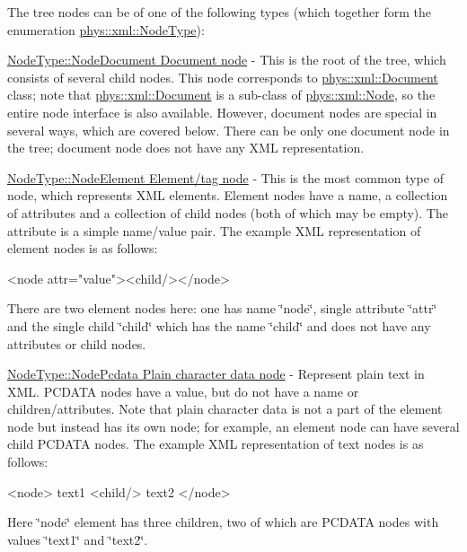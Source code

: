  \par
 The tree nodes can be of one of the following types (which together form the enumeration \hyperlink{namespacephys_1_1xml_a668b0cc666a9d49f7c7222a7552115d3}{phys::xml::NodeType}):
\begin{DoxyItemize}
\item \hyperlink{namespacephys_1_1xml_a668b0cc666a9d49f7c7222a7552115d3}{NodeType::NodeDocument Document node} -\/ This is the root of the tree, which consists of several child nodes. This node corresponds to \hyperlink{classphys_1_1xml_1_1Document}{phys::xml::Document} class; note that \hyperlink{classphys_1_1xml_1_1Document}{phys::xml::Document} is a sub-\/class of \hyperlink{classphys_1_1xml_1_1Node}{phys::xml::Node}, so the entire node interface is also available. However, document nodes are special in several ways, which are covered below. There can be only one document node in the tree; document node does not have any XML representation. \par

\item \hyperlink{namespacephys_1_1xml_a668b0cc666a9d49f7c7222a7552115d3}{NodeType::NodeElement Element/tag node} -\/ This is the most common type of node, which represents XML elements. Element nodes have a name, a collection of attributes and a collection of child nodes (both of which may be empty). The attribute is a simple name/value pair. The example XML representation of element nodes is as follows: 
\begin{DoxyCode}
 <node attr="value"><child/></node> 
\end{DoxyCode}
 There are two element nodes here: one has name \char`\"{}node\char`\"{}, single attribute \char`\"{}attr\char`\"{} and the single child \char`\"{}child\char`\"{} which has the name \char`\"{}child\char`\"{} and does not have any attributes or child nodes. \par

\item \hyperlink{namespacephys_1_1xml_a668b0cc666a9d49f7c7222a7552115d3}{NodeType::NodePcdata Plain character data node} -\/ Represent plain text in XML. PCDATA nodes have a value, but do not have a name or children/attributes. Note that plain character data is not a part of the element node but instead has its own node; for example, an element node can have several child PCDATA nodes. The example XML representation of text nodes is as follows: 
\begin{DoxyCode}
 <node> text1 <child/> text2 </node> 
\end{DoxyCode}
 Here \char`\"{}node\char`\"{} element has three children, two of which are PCDATA nodes with values \char`\"{}text1\char`\"{} and \char`\"{}text2\char`\"{}. \par


\end{DoxyItemize}
